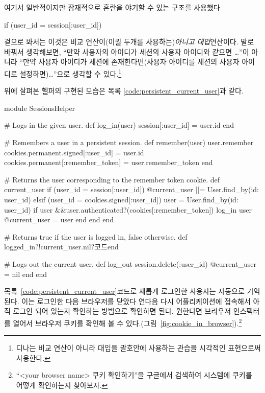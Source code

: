 {{\noindent 여기서 일반적이지만 잠재적으로 혼란을 야기할 수 있는 구조를 사용했다 

\begin{code} if (user_id = session[:user_id]) \end{code} 

\noindent 겉으로 봐서는 이것은 비교 연산이(이퀄 두개\kode{==}를 사용하는)\emph{아니고 }\emph{대입}연산이다. 말로 바꿔서 생각해보면, ``만약 사용자의 아이디가 세션의 사용자 아이디와 같으면 \ldots''이 아니라 ``만약 사용자 아이디가 세션에 존재한다면(사용자 아이디를 세션의 사용자 아이디로 설정하면)\ldots''으로 생각할 수 있다.\footnote{디나는 비교 연산이 아니라 대입을 괄호안에 사용하는 관습을 시각적인 표현으로써 사용한다.} 

위에 살펴본  헬퍼의 구현된 모습은 목록 \ref{code:persistent_current_user}과 같다. 

\begin{codelisting} \label{code:persistent_current_user}  

\begin{code} module SessionsHelper 

# Logs in the given user. def log_in(user) session[:user_id] = user.id end 

# Remembers a user in a persistent session. def remember(user) user.remember cookies.permanent.signed[:user_id] = user.id cookies.permanent[:remember_token] = user.remember_token end 

# Returns the user corresponding to the remember token cookie. def current_user if (user_id = session[:user_id]) @current_user ||= User.find_by(id: user_id) elsif (user_id = cookies.signed[:user_id]) user = User.find_by(id: user_id) if user &&user.authenticated?(cookies[:remember_token]) log_in user @current_user = user end end end 

# Returns true if the user is logged in, false otherwise. def logged_in?!current_user.nil?코드end 

# Logs out the current user. def log_out session.delete(:user_id) @current_user = nil end end \end{code} \end{codelisting} 

목록~\ref{code:persistent_current_user}코드로 새롭게 로그인한 사용자는 자동으로 기억된다. 이는 로그인한 다음 브라우저를 닫았다 연다음 다시 어플리케이션에 접속해서 아직 로그인 되어 있는지 확인하는 방법으로 확인하면 된다. 원한다면 브라우저 인스펙터를 열어서 브라우저 쿠키를 확인해 볼 수 있다.(그림~\ref{fig:cookie_in_browser}).\footnote{``<your browser name> 쿠키 확인하기''을 구글에서 검색하여 시스템에 쿠키를 어떻게 확인하는지 찾아보자.} 

}}
